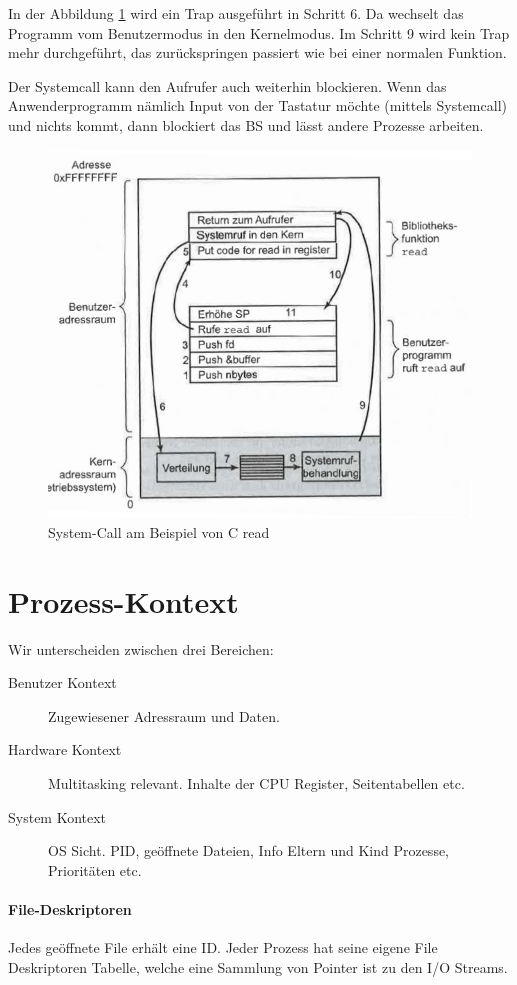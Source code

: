 In der Abbildung \ref{fig:system-software-ablauf-c-read} wird ein Trap ausgeführt in Schritt 6. Da wechselt das Programm vom Benutzermodus in den Kernelmodus. Im Schritt 9 wird kein Trap mehr durchgeführt, das zurückspringen passiert wie bei einer normalen Funktion.

Der Systemcall kann den Aufrufer auch weiterhin blockieren. Wenn das Anwenderprogramm nämlich Input von der Tastatur möchte (mittels Systemcall) und nichts kommt, dann blockiert das BS und lässt andere Prozesse arbeiten.

\begin{figure}[h!]
\centering
\includegraphics[width=0.6\linewidth]{fig/system-software-ablauf-c-read}
\caption{System-Call am Beispiel von C read}
\label{fig:system-software-ablauf-c-read}
\end{figure}

\section{Prozess-Kontext}
Wir unterscheiden zwischen drei Bereichen:
\begin{description}
	\item[Benutzer Kontext] Zugewiesener Adressraum und Daten.
	\item[Hardware Kontext] Multitasking relevant. Inhalte der CPU Register, Seitentabellen etc.
	\item[System Kontext] OS Sicht. PID, geöffnete Dateien, Info Eltern und Kind Prozesse, Prioritäten etc. 
\end{description}

\paragraph{File-Deskriptoren}
Jedes geöffnete File erhält eine ID. Jeder Prozess hat seine eigene File Deskriptoren Tabelle, welche eine Sammlung von Pointer ist zu den I/O Streams.


